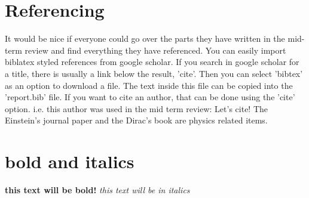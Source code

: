 \section{Referencing}
It would be nice if everyone could go over the parts they have written in the mid-term review and find everything they have referenced. You can easily import biblatex styled references from google scholar. If you search in google scholar for a title, there is usually a link below the result, 'cite'. Then you can select 'bibtex' as an option to download a file. The text inside this file can be copied into the 'report.bib' file. If you want to cite an author, that can be done using the 'cite' option. i.e. this author was used in the mid term review:
Let's cite! The Einstein's journal paper \cite{mautz2012indoor} and the Dirac's 
book \cite{meneses2012large} are physics related items. 

\section{bold and italics}
\textbf{this text will be bold!}
\textit{this text will be in italics}




